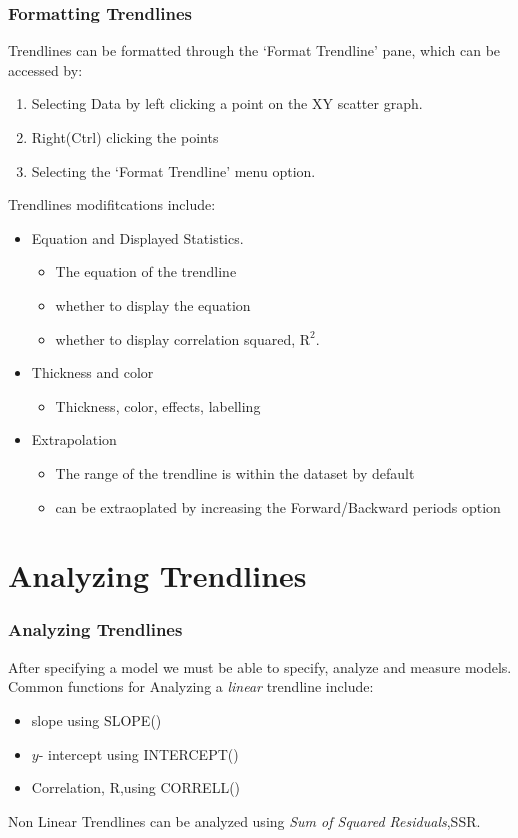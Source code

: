 \documentclass[12pt]{beamer}
\begin{document}
	\begin{frame}
		\frametitle{Formatting Trendlines}
		Trendlines can be formatted through the `Format Trendline' pane, which can be accessed by:
		\begin{enumerate}
			\item Selecting Data by left clicking a point on the XY scatter graph.
			\item Right(Ctrl) clicking the points
			\item Selecting the `Format Trendline' menu option.
		\end{enumerate} 
	\bigskip
		Trendlines modifitcations include:
			\begin{itemize}
				\item Equation and Displayed Statistics.
					\begin{itemize}
						\item The equation of the trendline
						\item whether to display the equation
						\item whether to display correlation squared, $\text{R}^2$. 
					\end{itemize} 
				\item Thickness and color
					\begin{itemize}
						\item  Thickness, color, effects, labelling 
					\end{itemize}
				\item Extrapolation
					\begin{itemize}
						\item The range of the trendline is within the dataset by default
						\item can be extraoplated by increasing the Forward/Backward periods option
					\end{itemize}
		\end{itemize}
	\end{frame}
\section{Analyzing Trendlines}
	\begin{frame}
		\frametitle{Analyzing Trendlines}
		After specifying a model we must be able to specify, analyze and measure models. 
		Common functions for Analyzing a \textit{linear} trendline include:
		\begin{itemize}
			\item slope using SLOPE()
			\item $y$- intercept using INTERCEPT()
			\item Correlation, R,using CORRELL()
		\end{itemize}
		Non Linear Trendlines can be analyzed using \textit{Sum of Squared Residuals},SSR. 
	\end{frame}
\end{document}
